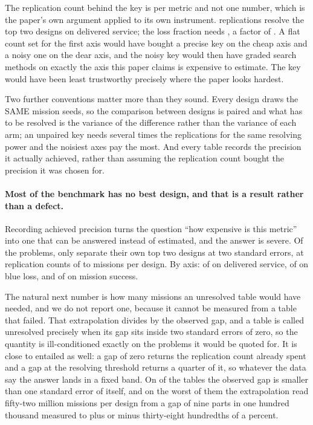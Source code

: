 \documentclass[11pt]{article}
\begin{document}
The replication count behind the key is per metric and not one number, which is the paper's own
argument applied to its own instrument. \BnRepsSrv{} replications resolve the top two designs on
delivered service; the loss fraction needs \BnRepsLoss{}, a factor of \BnRepsRatio{}. A flat count
set for the first axis would have bought a precise key on the cheap axis and a noisy one on the
dear axis, and the noisy key would then have graded search methods on exactly the axis this paper
claims is expensive to estimate. The key would have been least trustworthy precisely where the
paper looks hardest.

Two further conventions matter more than they sound. Every design draws the SAME mission seeds, so
the comparison between designs is paired and what has to be resolved is the variance of the
difference rather than the variance of each arm; an unpaired key needs several times the
replications for the same resolving power and the noisiest axes pay the most. And every table
records the precision it actually achieved, rather than assuming the replication count bought the
precision it was chosen for.

\paragraph{Most of the benchmark has no best design, and that is a result rather than a defect.}
Recording achieved precision turns the question ``how expensive is this metric'' into one that can
be answered instead of estimated, and the answer is severe. Of the \BnKeyProblems{} problems, only
\BnKeyResolved{} separate their own top two designs at two standard errors, at replication counts
of \BnRepsSrv{} to \BnRepsLoss{} missions per design. By axis: \BnKeyResSrv{} of \BnKeyNSrv{} on
delivered service, \BnKeyResLoss{} of \BnKeyNLoss{} on blue loss, and \BnKeyResSucc{} of
\BnKeyNSucc{} on mission success.

The natural next number is how many missions an unresolved table would have needed, and we do not
report one, because it cannot be measured from a table that failed. That extrapolation divides by
the observed gap, and a table is called unresolved precisely when its gap sits inside two standard
errors of zero, so the quantity is ill-conditioned exactly on the problems it would be quoted for.
It is close to entailed as well: a gap of zero returns the replication count already spent and a
gap at the resolving threshold returns a quarter of it, so whatever the data say the answer lands
in a fixed band. On \BnKeyNoisy{} of the \BnKeyProblems{} tables the observed gap is smaller than
one standard error of itself, and on the worst of them the extrapolation read fifty-two million
missions per design from a gap of nine parts in one hundred thousand measured to plus or minus
thirty-eight hundredths of a percent.
\end{document}
